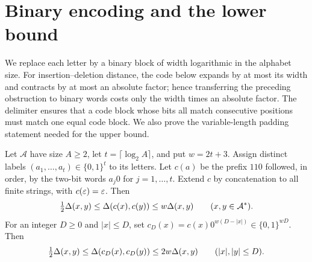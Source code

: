 \section{Binary encoding and the lower bound}\label{sec:binary}

We replace each letter by a binary block of width logarithmic in the
alphabet size. For insertion--deletion distance, the code below expands
by at most its width and contracts by at most an absolute factor; hence
transferring the preceding obstruction to binary words costs only the
width times an absolute factor. The delimiter ensures that a code block
whose bits all match consecutive positions must match one equal code
block. We also prove the variable-length padding statement needed for
the upper bound.

\begin{lemma}\label{lem:binary-code}
Let $\mathcal A$ have size $A\ge2$, let
$t=\lceil\log_2A\rceil$, and put $w=2t+3$. Assign distinct labels
$(a_1,\ldots,a_t)\in\{0,1\}^t$ to its letters. Let $c(a)$ be the
prefix $110$ followed, in order, by the two-bit words $a_j0$ for
$j=1,\ldots,t$.
Extend $c$ by concatenation to all finite strings, with
$c(\varepsilon)=\varepsilon$. Then
\begin{equation}\label{eq:code-unpadded}
 \tfrac12\Delta(x,y)\le\Delta(c(x),c(y))\le w\Delta(x,y)
 \qquad(x,y\in\mathcal A^*).
\end{equation}
For an integer $D\ge0$ and $|x|\le D$, set
$c_D(x)=c(x)0^{w(D-|x|)}\in\{0,1\}^{wD}$. Then
\begin{equation}\label{eq:code-padded}
 \tfrac12\Delta(x,y)\le\Delta(c_D(x),c_D(y))\le2w\Delta(x,y)
 \qquad(|x|,|y|\le D).
\end{equation}
\end{lemma}

